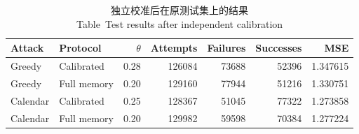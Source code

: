 \begin{table}[htbp]\centering\small
\caption{独立校准后在原测试集上的结果\\ Table~\thetable\quad Test results after independent calibration}\label{tab:matched}
\begin{tabular}{llrrrrr}\toprule
Attack & Protocol & $\theta$ & Attempts & Failures & Successes & MSE\\\midrule
Greedy & Calibrated & 0.28 & 126084 & 73688 & 52396 & 1.347615\\
Greedy & Full memory & 0.20 & 129160 & 77944 & 51216 & 1.330751\\
Calendar & Calibrated & 0.25 & 128367 & 51045 & 77322 & 1.273858\\
Calendar & Full memory & 0.20 & 129982 & 59598 & 70384 & 1.277224\\
\bottomrule\end{tabular}
\end{table}